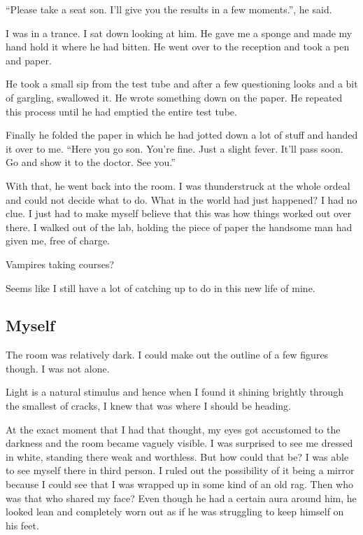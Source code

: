 \documentclass[twoside,11pt,titlepage]{article}
\begin{document}
``Please take a seat son. I'll give you the results in a few moments.'', he said.

I was in a trance. I sat down looking at him. He gave me a sponge and made my hand hold it where he had bitten. He went over to the reception and took a pen and paper.

He took a small sip from the test tube and after a few questioning looks and a bit of gargling, swallowed it. He wrote something down on the paper. He repeated this process until he had emptied the entire test tube.

Finally he folded the paper in which he had jotted down a lot of stuff and handed it over to me. ``Here you go son. You're fine. Just a slight fever. It'll pass soon. Go and show it to the doctor. See you.''

With that, he went back into the room. I was thunderstruck at the whole ordeal and could not decide what to do. What in the world had just happened? I had no clue. I just had to make myself believe that this was how things worked out over there. I walked out of the lab, holding the piece of paper the handsome man had given me, free of charge.

Vampires taking courses?

Seems like I still have a lot of catching up to do in this new life of mine.

\newpage
\begin{center}
  \section{Myself}
\end{center}
\bigskip
\bigskip
\bigskip

The room was relatively dark. I could make out the outline of a few figures though. I was not alone.

Light is a natural stimulus and hence when I found it shining brightly through the smallest of cracks, I knew that was where I should be heading.

At the exact moment that I had that thought, my eyes got accustomed to the darkness and the room became vaguely visible. I was surprised to see me dressed in white, standing there weak and worthless. But how could that be? I was able to see myself there in third person. I ruled out the possibility of it being a mirror because I could see that I was wrapped up in some kind of an old rag. Then who was that who shared my face? Even though he had a certain aura around him, he looked lean and completely worn out as if he was struggling to keep himself on his feet.
\end{document}
